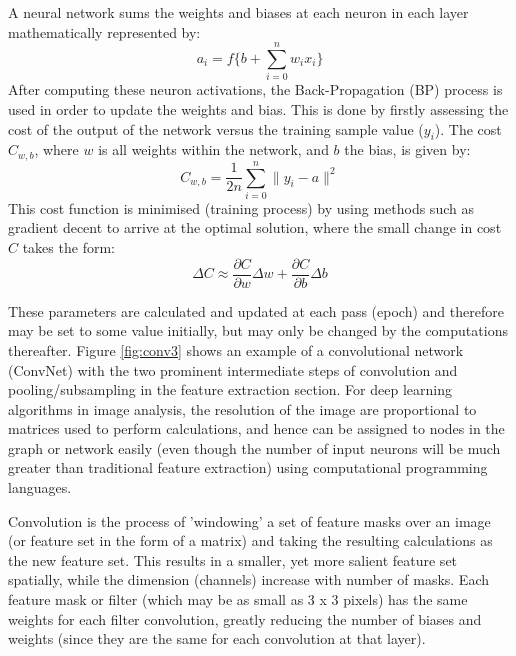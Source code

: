 \documentclass[fleqn,twoside,12pt]{report}
\begin{document}
A neural network sums the weights and biases at each neuron in each layer mathematically represented by: 
\begin{equation}
a_i = f\bigg\{b + \sum_{i=0}^{n} w_i x_i \bigg\}	
\end{equation}
After computing these neuron activations, the Back-Propagation (BP) process is used in order to update the weights and bias. This is done by firstly assessing the cost of the output of the network versus the training sample value ($y_i$). The cost $C_{w,b}$, where $w$ is all weights within the network, and $b$ the bias, is given by:
\begin{equation}
C_{w,b} = \frac{1}{2n} \sum_{i=0}^{n} \|y_i - a\|^2	
\end{equation}
This cost function is minimised (training process) by using methods such as gradient decent to arrive at the optimal solution, where the small change in cost $C$ takes the form:
\begin{equation}
\Delta C \approx \frac{\partial C}{\partial w} \Delta w + \frac{\partial C}{\partial b} \Delta b	
\end{equation}

These parameters are calculated and updated at each pass (epoch) and therefore may be set to some value initially, but may only be changed by the computations thereafter. Figure \ref{fig:conv3} shows an example of a convolutional network (ConvNet) with the two prominent intermediate steps of convolution and pooling/subsampling in the feature extraction section. For deep learning algorithms in image analysis, the resolution of the image are proportional to matrices used to perform calculations, and hence can be assigned to nodes in the graph or network easily (even though the number of input neurons will be much greater than traditional feature extraction) using computational programming languages. 

Convolution is the process of 'windowing' a set of feature masks over an image (or feature set in the form of a matrix) and taking the resulting calculations as the new feature set. This results in a smaller, yet more salient feature set spatially, while the dimension (channels) increase with number of masks. Each feature mask or filter (which may be as small as 3 x 3 pixels) has the same weights for each filter convolution, greatly reducing the number of biases and weights (since they are the same for each convolution at that layer). 
\end{document}

